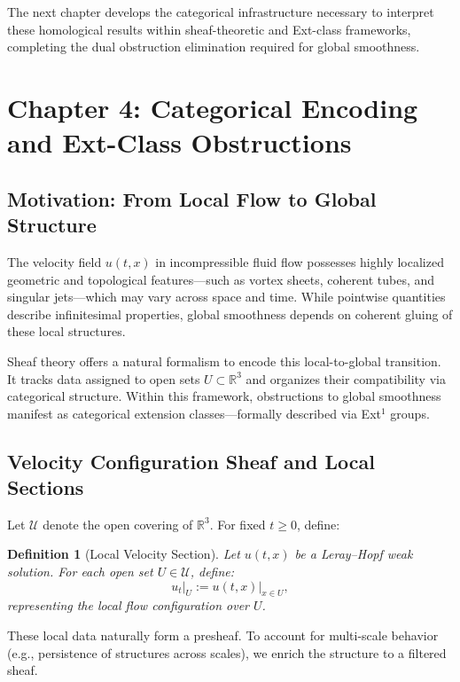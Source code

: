 \documentclass[11pt]{article}
\newtheorem{definition}[theorem]{Definition}
\begin{document}
The next chapter develops the categorical infrastructure necessary to interpret these homological results within sheaf-theoretic and Ext-class frameworks, completing the dual obstruction elimination required for global smoothness.



\section{Chapter 4: Categorical Encoding and Ext-Class Obstructions}
\label{sec:sheaf-ext-collapse}

\subsection{Motivation: From Local Flow to Global Structure}

The velocity field \( u(t,x) \) in incompressible fluid flow possesses highly localized geometric and topological features—such as vortex sheets, coherent tubes, and singular jets—which may vary across space and time. While pointwise quantities describe infinitesimal properties, global smoothness depends on coherent gluing of these local structures.

Sheaf theory offers a natural formalism to encode this local-to-global transition. It tracks data assigned to open sets \( U \subset \mathbb{R}^3 \) and organizes their compatibility via categorical structure. Within this framework, obstructions to global smoothness manifest as categorical extension classes—formally described via Ext$^1$ groups.

\subsection{Velocity Configuration Sheaf and Local Sections}

Let \( \mathcal{U} \) denote the open covering of \( \mathbb{R}^3 \). For fixed \( t \geq 0 \), define:

\begin{definition}[Local Velocity Section]
Let \( u(t,x) \) be a Leray--Hopf weak solution. For each open set \( U \in \mathcal{U} \), define:
\[
u_t|_U := \left. u(t,x) \right|_{x \in U},
\]
representing the local flow configuration over \( U \).
\end{definition}

These local data naturally form a presheaf. To account for multi-scale behavior (e.g., persistence of structures across scales), we enrich the structure to a filtered sheaf.
\end{document}
